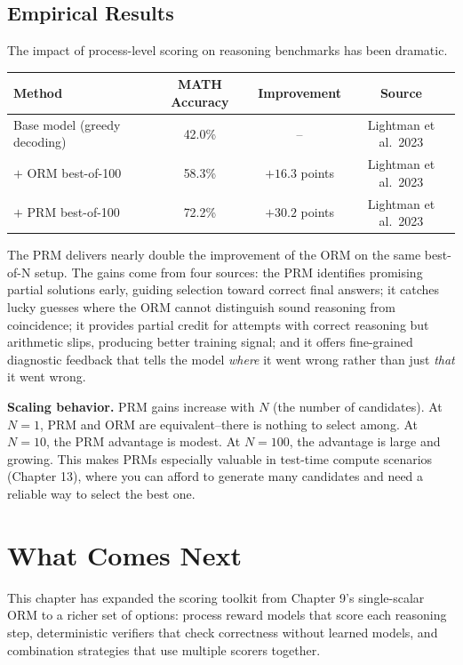 \begin{chapterenv}
\subsection{Empirical Results}

The impact of process-level scoring on reasoning benchmarks has been dramatic.

\begin{center}
\begin{tabular}{lccc}
\toprule
\textbf{Method} & \textbf{MATH Accuracy} & \textbf{Improvement} & \textbf{Source} \\
\midrule
Base model (greedy decoding) & 42.0\% & -- & Lightman et al.\ 2023 \\
$+$ ORM best-of-100 & 58.3\% & $+16.3$ points & Lightman et al.\ 2023 \\
$+$ PRM best-of-100 & 72.2\% & $+30.2$ points & Lightman et al.\ 2023 \\
\bottomrule
\end{tabular}
\end{center}

The PRM delivers nearly double the improvement of the ORM on the same best-of-N setup. The gains come from four sources: the PRM identifies promising partial solutions early, guiding selection toward correct final answers; it catches lucky guesses where the ORM cannot distinguish sound reasoning from coincidence; it provides partial credit for attempts with correct reasoning but arithmetic slips, producing better training signal; and it offers fine-grained diagnostic feedback that tells the model \textit{where} it went wrong rather than just \textit{that} it went wrong.

\begin{tipbox}
\textbf{Scaling behavior.} PRM gains increase with $N$ (the number of candidates). At $N = 1$, PRM and ORM are equivalent--there is nothing to select among. At $N = 10$, the PRM advantage is modest. At $N = 100$, the advantage is large and growing. This makes PRMs especially valuable in test-time compute scenarios (Chapter 13), where you can afford to generate many candidates and need a reliable way to select the best one.
\end{tipbox}

\section{What Comes Next}

This chapter has expanded the scoring toolkit from Chapter 9's single-scalar ORM to a richer set of options: process reward models that score each reasoning step, deterministic verifiers that check correctness without learned models, and combination strategies that use multiple scorers together.


\end{chapterenv}

